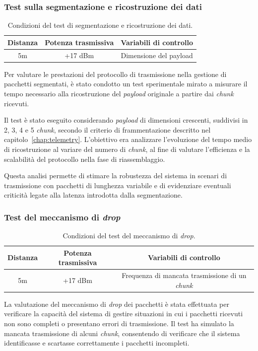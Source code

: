 \documentclass[12pt,a4paper,twoside]{book}
\begin{document}
\subsubsection{Test sulla segmentazione e ricostruzione dei dati}
\begin{table}[H]
    \centering
    \begin{tabular}{|c|c|c|}
        \hline
        \textbf{Distanza} & \textbf{Potenza trasmissiva} & \textbf{Variabili di controllo} \\ \hline
        5m                & +17 dBm                      & Dimensione del payload          \\ \hline
    \end{tabular}
    \caption{Condizioni del test di segmentazione e ricostruzione dei dati.}
    \label{tab:T2-conditions}
\end{table}

Per valutare le prestazioni del protocollo di trasmissione nella gestione di pacchetti segmentati,
è stato condotto un test sperimentale mirato a misurare il tempo necessario alla ricostruzione
del \emph{payload} originale a partire dai \emph{chunk} ricevuti.

Il test è stato eseguito considerando \emph{payload} di dimensioni crescenti, suddivisi in 2, 3, 4 e 5
\emph{chunk}, secondo il criterio di frammentazione descritto nel capitolo~\ref{chap:telemetry}.
L’obiettivo era analizzare l’evoluzione del tempo medio di ricostruzione al variare del numero di
\emph{chunk}, al fine di valutare l’efficienza e la scalabilità del protocollo nella fase di riassemblaggio.

Questa analisi permette di stimare la robustezza del sistema in scenari di trasmissione con pacchetti
di lunghezza variabile e di evidenziare eventuali criticità legate alla latenza introdotta dalla segmentazione.

\subsubsection{Test del meccanismo di \emph{drop}}
\begin{table}[H]
    \centering
    \begin{tabular}{|c|c|c|}
        \hline
        \textbf{Distanza} & \textbf{Potenza trasmissiva} & \textbf{Variabili di controllo}                      \\ \hline
        5m                & +17 dBm                      & Frequenza di mancata trasmissione di un \emph{chunk} \\ \hline
    \end{tabular}
    \caption{Condizioni del test del meccanismo di \emph{drop}.}
    \label{tab:T3-conditions}
\end{table}
La valutazione del meccanismo di \emph{drop} dei pacchetti è stata effettuata
per verificare la capacità del sistema di gestire situazioni in cui i pacchetti
ricevuti non sono completi o presentano errori di trasmissione.
Il test ha simulato la mancata trasmissione di alcuni \emph{chunk}, consentendo di
verificare che il sistema identificasse e scartasse correttamente i pacchetti incompleti.
\end{document}
